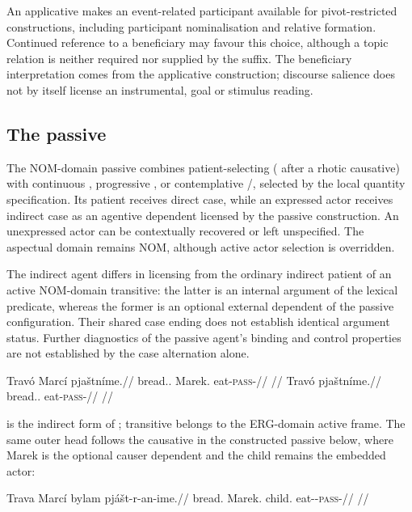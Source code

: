 An applicative makes an event-related participant available for pivot-restricted
constructions, including participant nominalisation and relative formation.
Continued reference to a beneficiary may favour this choice, although a topic
relation is neither required nor supplied by the suffix. The beneficiary
interpretation comes from the applicative construction; discourse salience
does not by itself license an instrumental, goal or stimulus reading.

\subsection{The passive}\label{sec:vm-passive}

The NOM-domain passive combines patient-selecting 
( after a rhotic causative) with continuous
, progressive , or contemplative /, selected by the local
quantity specification. Its patient
receives direct case, while an expressed actor receives indirect case as an
agentive dependent licensed by the passive construction. An unexpressed actor
can be contextually recovered or left unspecified. The aspectual domain remains
NOM, although active actor selection is overridden.

The indirect agent differs in licensing from the ordinary indirect patient of
an active NOM-domain transitive: the latter is an internal argument of the
lexical predicate, whereas the former is an optional external dependent of the
passive configuration. Their shared case ending does not establish identical
argument status. Further diagnostics of the passive agent's binding and control
properties are not established by the case alternation alone.

\pex
\a
\begingl
\gla Travó Marcí pjaštníme.//
\glb bread.\Dir{}.\Def{} Marek.\Ind{} eat-\textsc{pass}-\Prog{}//
\glft {}//
\endgl
\a
\begingl
\gla Travó pjaštníme.//
\glb bread.\Dir{}.\Def{} eat-\textsc{pass}-\Prog{}//
\glft {}//
\endgl
\xe

 is the indirect form of ; transitive 
belongs to the ERG-domain active frame. The same outer head follows the
causative in the constructed passive below, where Marek is the optional causer
dependent and the child remains the embedded actor:

\ex
\begingl
\gla Trava Marcí bylam pjášt-r-an-ime.//
\glb bread.\Dir{} Marek.\Ind{} child.\Ind{} eat-\Caus{}-\textsc{pass}-\Prog{}//
\glft {}//
\endgl
\xe

